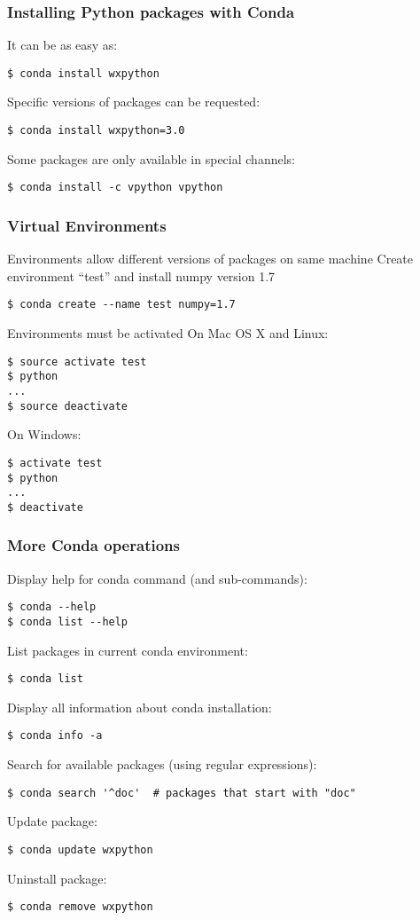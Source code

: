 \documentclass[10pt]{beamer}
\begin{document}
\begin{frame}[fragile]
\frametitle{Installing Python packages with Conda}
It can be as easy as:
\begin{verbatim}
$ conda install wxpython
\end{verbatim}
Specific versions of packages can be requested:
\begin{verbatim}
$ conda install wxpython=3.0
\end{verbatim}
Some packages are only available in special channels:
\begin{verbatim}
$ conda install -c vpython vpython
\end{verbatim}
\end{frame}

\begin{frame}[fragile]
\frametitle{Virtual Environments}
Environments allow different versions of packages on same machine
\vskip10pt
Create environment ``test'' and install numpy version 1.7
\begin{verbatim}
$ conda create --name test numpy=1.7
\end{verbatim}
Environments must be activated
\vskip10pt
On Mac OS X and Linux:
\begin{verbatim}
$ source activate test
$ python
...
$ source deactivate
\end{verbatim}
On Windows:
\begin{verbatim}
$ activate test
$ python
...
$ deactivate
\end{verbatim}
\end{frame}

\begin{frame}[fragile]
\frametitle{More Conda operations}
Display help for conda command (and sub-commands):
\begin{verbatim}
$ conda --help
$ conda list --help
\end{verbatim}
List packages in current conda environment:
\begin{verbatim}
$ conda list
\end{verbatim}
Display all information about conda installation:
\begin{verbatim}
$ conda info -a
\end{verbatim}
Search for available packages (using regular expressions):
\begin{verbatim}
$ conda search '^doc'  # packages that start with "doc"
\end{verbatim}
Update package:
\begin{verbatim}
$ conda update wxpython
\end{verbatim}
Uninstall package:
\begin{verbatim}
$ conda remove wxpython
\end{verbatim}
\end{frame}
\end{document}
